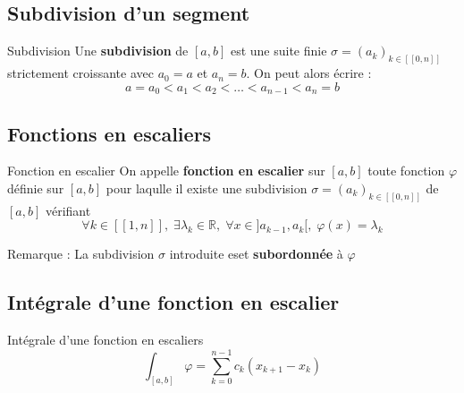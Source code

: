 \subsection{Subdivision d'un segment} %
\label{sub:Subdivision d'un segment}

\begin{Definition}[colbacktitle=red!75!black]{Subdivision}{}
  Une \textbf{subdivision} de $[a,b]$ est une suite finie $\sigma = (a_k) _{k \in [\![0,n]\!]}$ strictement croissante avec $a_0 = a$ et $a_n = b$. On peut alors écrire :
  \begin{equation}
    a = a_0 < a_1 < a_2 < \dots <a _{n-1} < a_n = b
  \end{equation}
\end{Definition}





\subsection{Fonctions en escaliers} %
\label{sub:Fonctions en escaliers}

\begin{Definition}[colbacktitle=red!75!black]{Fonction en escalier}{}
  On appelle \textbf{fonction en escalier} sur $[a,b]$ toute fonction $\varphi$ définie sur $[a,b]$ pour laqulle il existe une subdivision $\sigma = (a_k) _{k \in [\![0, n]\!]}$ de $[a,b]$ vérifiant 
  \begin{equation}
    \forall k\in [\![1, n]\!],\; \exists \lambda_k \in \mathbb{R},\; \forall x\in ]a _{k-1}, a_k[, \; \varphi(x) = \lambda_k
  \end{equation}
\end{Definition}

Remarque : La subdivision $\sigma$ introduite eset \textbf{subordonnée} à $\varphi$




\subsection{Intégrale d'une fonction en escalier} %
\label{sub:Intégrale d'une fonction en escalier}

\begin{Definition}[colbacktitle=red!75!black]{Intégrale d'une fonction en escaliers}{}
\begin{equation}
  \int_{[a,b]}^{} \varphi = \sum_{k=0}^{n-1} c_k (x _{k+1} - x_k)
\end{equation}
\end{Definition}

